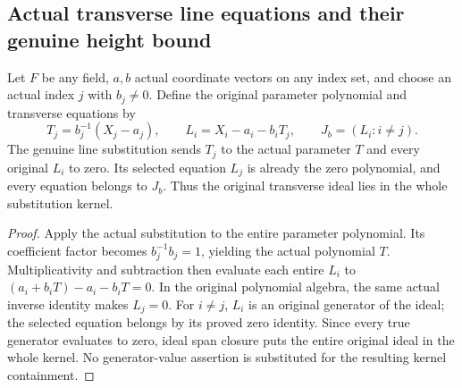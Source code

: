 \subsection{Actual transverse line equations and their genuine height bound}
\label{subsec:actual-affine-line-equations}

\begin{definition}
\label{algebra:line-parameter-equations}
\leanok
{}
Let $F$ be any field, $a,b$ actual coordinate vectors on any index set,
and choose an actual index $j$ with $b_j\ne0$. Define the original
parameter polynomial and transverse equations by
\[
 T_j=b_j^{-1}(X_j-a_j),\qquad
 L_i=X_i-a_i-b_iT_j,\qquad
 J_b=(L_i:i\ne j).
\]
The genuine line substitution sends $T_j$ to the actual parameter $T$
and every original $L_i$ to zero. Its selected equation $L_j$ is
already the zero polynomial, and every equation belongs to $J_b$.
Thus the original transverse ideal lies in the whole substitution kernel.
\end{definition}
\begin{proof}
Apply the actual substitution to the entire parameter polynomial. Its
coefficient factor becomes $b_j^{-1}b_j=1$, yielding the actual polynomial
$T$. Multiplicativity and subtraction then evaluate each entire $L_i$
to $(a_i+b_iT)-a_i-b_iT=0$. In the original polynomial algebra, the
same actual inverse identity makes $L_j=0$. For $i\ne j$, $L_i$ is
an original generator of the ideal; the selected equation belongs by
its proved zero identity. Since every true generator evaluates to zero,
ideal span closure puts the entire original ideal in the whole kernel.
No generator-value assertion is substituted for the resulting kernel containment.
\end{proof}


